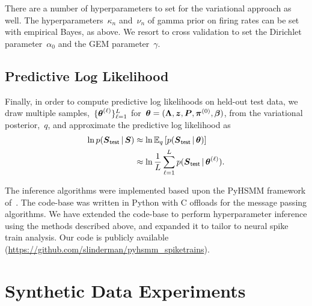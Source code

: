 There are a number of hyperparameters to set for the variational
approach as well. The hyperparameters~$\kappa_n$ and~$\nu_n$ of
gamma prior on firing rates can be set with empirical Bayes, as
above. We resort to cross validation to set the Dirichlet
parameter~$\alpha_0$ and the GEM parameter~$\gamma$.
 

\subsection{Predictive Log Likelihood}
Finally, in order to compute predictive log likelihoods on held-out
test data, we draw multiple samples,~$\{\boldsymbol{\theta}^{(\ell)}\}_{\ell=1}^L$
for~$\boldsymbol{\theta}=(\boldsymbol{\Lambda}, \boldsymbol{z}, \boldsymbol{P}, \boldsymbol{\pi}^{(0)}, \boldsymbol{\beta})$, from the
variational posterior,~$q$, and approximate the predictive log likelihood as
\begin{align*}
  \ln p(\boldsymbol{S}_{\mathsf{test}} \,|\, \boldsymbol{S}) 
  &\approx \ln \mathbb{E}_q\left[p(\boldsymbol{S}_{\mathsf{test}} \,|\, \boldsymbol{\theta})\right] \\
  &\approx \ln \frac{1}{L} \sum_{\ell=1}^L p(\boldsymbol{S}_{\mathsf{test}} \,|\, \boldsymbol{\theta}^{(\ell)}).
\end{align*}

The inference algorithms were implemented based upon the PyHSMM
framework of~\citep{Johnson14b}. The code-base was written in Python
with C offloads for the message passing algorithms.  We have
extended the code-base to perform hyperparameter inference using the
methods described above, and expanded it to tailor to neural spike
train analysis. Our code is publicly available
({\url{https://github.com/slinderman/pyhsmm_spiketrains}}).

\section{Synthetic Data Experiments}

